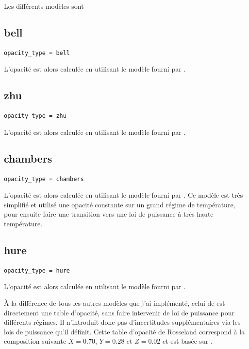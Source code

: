 Les différents modèles sont \citep{bell1994FU, zhu2009nonsteady, chambers2009analytic, hure2000transition}

\subsection{bell}
\begin{verbatim}
opacity_type = bell
\end{verbatim}

L'opacité est alors calculée en utilisant le modèle fourni par \cite{bell1994FU}. 

\subsection{zhu}
\begin{verbatim}
opacity_type = zhu
\end{verbatim}

L'opacité est alors calculée en utilisant le modèle fourni par \cite{zhu2009nonsteady}. 

\subsection{chambers}
\begin{verbatim}
opacity_type = chambers
\end{verbatim}

L'opacité est alors calculée en utilisant le modèle fourni par \cite{chambers2009analytic}. Ce modèle est très simplifié et utilisé une opacité constante sur un grand régime de température, pour ensuite faire une transition vers une loi de puissance à très haute température.

\subsection{hure}
\begin{verbatim}
opacity_type = hure
\end{verbatim}

L'opacité est alors calculée en utilisant le modèle fourni par \cite{hure2000transition}. 

À la différence de tous les autres modèles que j'ai implémenté, celui de \cite{hure2000transition} est directement une table d'opacité, sans faire intervenir de loi de puissance pour différents régimes. Il n'introduit donc pas d'incertitudes supplémentaires via les lois de puissance qu'il définit. Cette table
d'opacité de Rosseland correspond à la composition suivante $X=0.70$, $Y=0.28$ et $Z=0.02$ et est basée sur
\cite{seaton1994opacities, alexander1994low, henning1996dust}.

